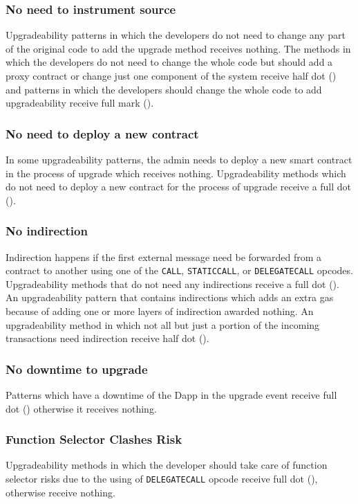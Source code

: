 \subsubsection{No need to instrument source}
Upgradeability patterns in which the developers do not need to change any part of the original code to add the upgrade method receives nothing. The methods in which the developers do not need to change the whole code but should add a proxy contract or change just one component of the system receive half dot (\prt) and patterns in which the developers should change the whole code to add upgradeability receive full mark (\full).


\subsubsection{No need to deploy a new contract}
In some upgradeability patterns, the admin needs to deploy a new smart contract in the process of upgrade which receives nothing. Upgradeability methods which do not need to deploy a new contract for the process of upgrade receive a full dot (\full).

\subsubsection{No indirection}  
Indirection happens if the first external message need be forwarded from a contract to another using one of the \texttt{CALL}, \texttt{STATICCALL}, or \texttt{DELEGATECALL} opcodes. Upgradeability methods that do not need any indirections receive a full dot (\full). An upgradeability pattern that contains indirections which adds an extra gas because of adding one or more layers of indirection awarded nothing. An upgradeability method in which not all but just a portion of the incoming transactions need indirection receive half dot (\prt). 


\subsubsection{No downtime to upgrade}
Patterns which have a downtime of the Dapp in the upgrade event receive full dot (\full) otherwise it receives nothing. 

\subsubsection{Function Selector Clashes Risk}
Upgradeability methods in which the developer should take care of function selector risks due to the using of \texttt{DELEGATECALL} opcode receive full dot (\full), otherwise receive nothing. 

